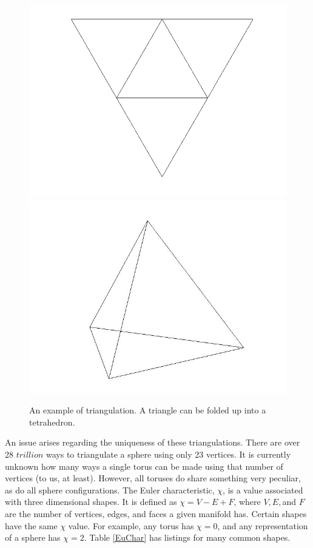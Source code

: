 \documentclass[12pt]{article}
\begin{document}
\begin{figure}
\includegraphics[scale = 0.5]{flattetrahedron.png}
\includegraphics[scale = 0.3]{tetrahedron.jpg}
\caption{An example of triangulation. A triangle can be folded up into a tetrahedron.}
\end{figure}

\noindent An issue arises regarding the uniqueness of these triangulations. There are over 28 $trillion$ ways to triangulate a sphere using only 23 vertices. It is currently unknown how many ways a single torus can be made using that number of vertices (to us, at least). However, all toruses do share something very peculiar, as do all sphere configurations. The Euler characteristic, $\chi$, is a value associated with three dimensional shapes. It is defined as $\displaystyle\chi = V - E + F$, where $V, E, $and $F$ are the number of vertices, edges, and faces a given manifold has. Certain shapes have the same $\chi$ value. For example, any torus has $\chi = 0$, and any representation of a sphere has $\chi = 2.$ Table \ref{EuChar} has listings for many common shapes. 
\end{document}
